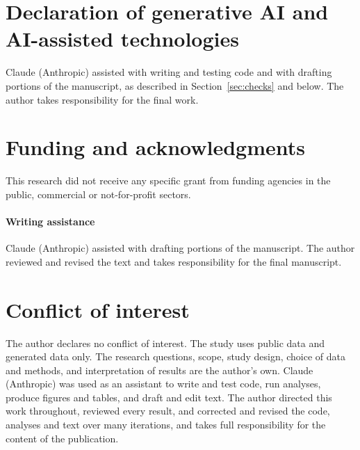 \section{Declaration of generative AI and AI-assisted technologies}
\label{sec:ai}
\ifjof
Claude (Anthropic) assisted with writing and testing code and with drafting portions of the manuscript, as described
in Section~\ref{sec:checks} and below. The author takes responsibility for the final work.

\section{Funding and acknowledgments}
This research did not receive any specific grant from funding agencies in the public, commercial or not-for-profit
sectors.

\paragraph{Writing assistance} Claude (Anthropic) assisted with drafting portions of the manuscript. The author
reviewed and revised the text and takes responsibility for the final manuscript.

\section{Conflict of interest}
The author declares no conflict of interest. The study uses public data and generated data only.
\else
The research questions, scope, study design, choice of data and methods, and
interpretation of results are the author's own. Claude (Anthropic) was used as an
assistant to write and test code, run analyses, produce figures and tables, and
draft and edit text. The author directed this work throughout, reviewed every
result, and corrected and revised the code, analyses and text over many
iterations, and takes full responsibility for the content of the publication.
\fi

